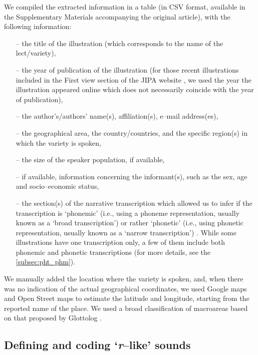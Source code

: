 We compiled the extracted information in a table (in CSV format, available in the Supplementary Materials accompanying the original article), with the following information:

\begin{itemize}
	\item[–] the title of the illustration (which corresponds to the name of the lect/variety),
	\item[–] the year of publication of the illustration (for those recent illustrations included in the First view section of the JIPA website \parencite[472]{arvanitiEditorialReportJIPA2019}, we used the year the illustration appeared online which does not necessarily coincide with the year of publication),
	\item[–] the author’s/authors’ name(s), affiliation(s), e–mail address(es),
	\item[–] the geographical area, the country/countries, and the specific region(s) in which the variety is spoken,
	\item[–] the size of the speaker population, if available,
	\item[–] if available, information concerning the informant(s), such as the sex, age and
	socio–economic status,
	\item[–] the section(s) of the narrative transcription which allowed us to infer if the transcription is ‘phonemic’ (i.e., using a phoneme representation, usually known as a ‘broad transcription’) or rather ‘phonetic’ (i.e., using phonetic representation, usually known as a ‘narrow transcription’) \parencite[Section 5]{ipaHandbookInternationalPhonetic1999}. While some illustrations have one transcription only, a few of them include both phonemic and phonetic transcriptions (for more details, see the \autoref{subsec:pht_phm}).
\end{itemize} 

We manually added the location where the variety is spoken, and, when there was no indication of the actual geographical coordinates, we used Google maps and Open Street maps to estimate the latitude and longitude, starting from the reported name of the place. We used a broad classification of macroareas based on that proposed by Glottolog \parencite{glottolog}.

\subsection{Defining and coding ‘\textit{r}–like’ sounds}

